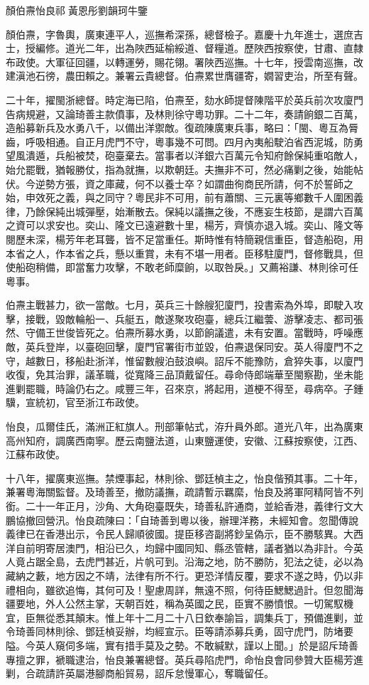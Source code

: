 
\begin{pinyinscope}
顏伯燾怡良祁黃恩彤劉韻珂牛鑒

顏伯燾，字魯輿，廣東連平人，巡撫希深孫，總督檢子。嘉慶十九年進士，選庶吉士，授編修。道光二年，出為陜西延榆綏道、督糧道。歷陜西按察使，甘肅、直隸布政使。大軍征回疆，以轉運勞，賜花翎。署陜西巡撫。十七年，授雲南巡撫，改建滇池石徬，農田賴之。兼署云貴總督。伯燾累世膺疆寄，嫺習吏治，所至有聲。

二十年，擢閩浙總督。時定海已陷，伯燾至，劾水師提督陳階平於英兵前次攻廈門告病規避，又論琦善主款僨事，及林則徐守粵功罪。二十二年，奏請餉銀二百萬，造船募新兵及水勇八千，以備出洋禦敵。復疏陳廣東兵事，略曰：「閩、粵互為脣齒，呼吸相通。自正月虎門不守，粵事幾不可問。四月內夷船駛泊省西泥城，防勇望風潰遁，兵船被焚，砲臺棄去。當事者以洋銀六百萬元令知府餘保純重啗敵人，始允罷戰，猶報勝仗，指為就撫，以欺朝廷。夫撫非不可，然必痛剿之後，始能帖伏。今逆勢方張，資之庫藏，何不以養士卒？如謂曲徇商民所請，何不於誓師之始，申效死之義，與之同守？粵民非不可用，前有蕭關、三元裏等鄉數千人圍困義律，乃餘保純出城彈壓，始漸散去。保純以議撫之後，不應妄生枝節，是謂六百萬之資可以求安也。奕山、隆文已遠避數十里，楊芳，齊慎亦退入城。奕山、隆文等閱歷未深，楊芳年老耳聾，皆不足當重任。斯時惟有特簡親信重臣，督造船砲，用本省之人，作本省之兵，懸以重賞，未有不堪一用者。臣移駐廈門，督修戰具，但使船砲稍備，即當奮力攻擊，不敢老師糜餉，以取咎戾。」又薦裕謙、林則徐可任粵事。

伯燾主戰甚力，欲一當敵。七月，英兵三十餘艘犯廈門，投書索為外埠，即駛入攻擊，接戰，毀敵輪船一、兵艇五，敵遂聚攻砲臺，總兵江繼蕓、游擊凌志、都司張然、守備王世俊皆死之。伯燾所募水勇，以節餉議遣，未有安置。當戰時，呼噪應敵，英兵登岸，以臺砲回擊，廈門官署街市並毀，伯燾退保同安。英人得廈門不之守，越數日，移船赴浙洋，惟留數艘泊鼓浪嶼。詔斥不能豫防，倉猝失事，以廈門收復，免其治罪，議革職，從寬降三品頂戴留任。尋命侍郎端華至閩察勘，坐未能進剿罷職，時論仍右之。咸豐三年，召來京，將起用，道梗不得至，尋病卒。子鍾驥，宣統初，官至浙江布政使。

怡良，瓜爾佳氏，滿洲正紅旗人。刑部筆帖式，洊升員外郎。道光八年，出為廣東高州知府，調廣西南寧。歷云南鹽法道，山東鹽運使，安徽、江蘇按察使，江西、江蘇布政使。

十八年，擢廣東巡撫。禁煙事起，林則徐、鄧廷楨主之，怡良偕預其事。二十年，兼署粵海關監督。及琦善至，撤防議撫，疏請暫示羈縻，怡良及將軍阿精阿皆不列銜。二十一年正月，沙角、大角砲臺既失，琦善私許通商，並給香港，義律行文大鵬協撤回營汛。怡良疏陳曰：「自琦善到粵以後，辦理洋務，未經知會。忽聞傳說義律已在香港出示，令民人歸順彼國。提臣移咨副將鈔呈偽示，臣不勝駭異。大西洋自前明寄居澳門，相沿已久，均歸中國同知、縣丞管轄，議者猶以為非計。今英人竟占踞全島，去虎門甚近，片帆可到。沿海之地，防不勝防，犯法之徒，必以為藏納之藪，地方因之不靖，法律有所不行。更恐洋情反覆，要求不遂之時，仍以非禮相向，雖欲追悔，其何可及！聖慮周詳，無遠不照，何待臣鰓鰓過計。但忽聞海疆要地，外人公然主掌，天朝百姓，稱為英國之民，臣實不勝憤恨。一切駕馭機宜，臣無從悉其顛末。惟上年十二月二十八日欽奉諭旨，調集兵丁，預備進剿，並令琦善同林則徐、鄧廷楨妥辦，均經宣示。臣等請添募兵勇，固守虎門，防堵要隘。今英人窺伺多端，實有措手莫及之勢。不敢緘默，謹以上聞。」於是詔斥琦善專擅之罪，褫職逮治，怡良兼署總督。英兵尋陷虎門，命怡良會同參贊大臣楊芳進剿，合疏請許英屬港腳商船貿易，詔斥怠慢軍心，奪職留任。


\end{pinyinscope}
